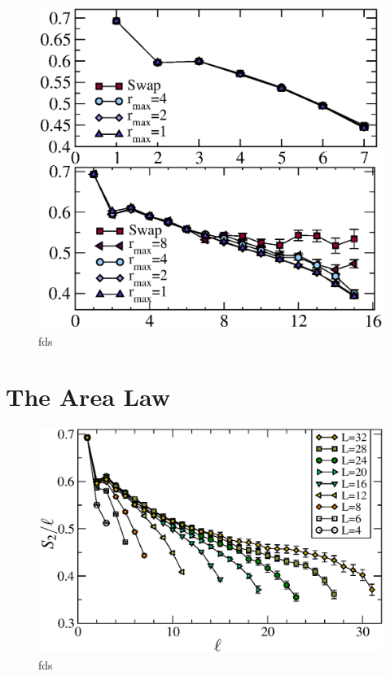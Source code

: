 \begin{figure} {
\includegraphics[width=6in]{./figures/paper2/fig_2DA/fig_L8n16.eps} 
\centering
\caption[fds]{ fds
\label{2Dfig}
}
} 
\end{figure}

\section{The Area Law}

\begin{figure} {
\includegraphics[width=6in]{./figures/paper2/fig_AreaL/fig4.eps} 
\centering
\caption[fds]{ fds
\label{2Dfig}
}
} 
\end{figure}
